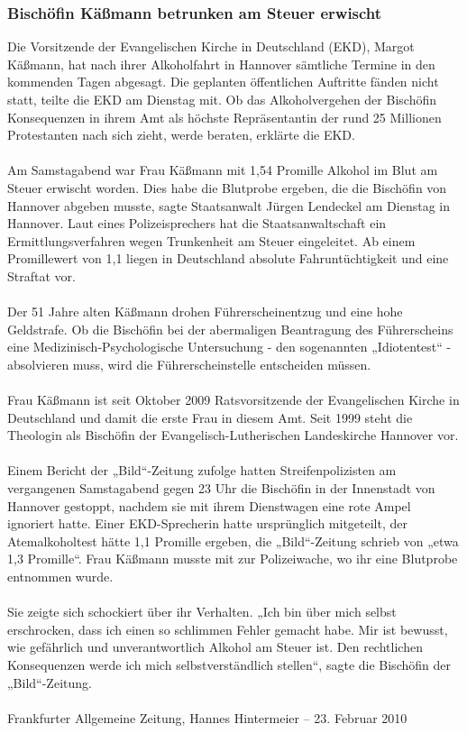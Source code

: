 \documentclass[a4paper,12pt,twoside]{scrbook}
\begin{document}
\subsubsection{Bischöfin Käßmann betrunken am Steuer erwischt}
Die Vorsitzende der Evangelischen Kirche in Deutschland (EKD), Margot Käßmann, hat nach ihrer Alkoholfahrt in Hannover sämtliche Termine in den kommenden Tagen abgesagt. Die geplanten öffentlichen Auftritte fänden nicht statt, teilte die EKD am Dienstag mit. Ob das Alkoholvergehen der Bischöfin Konsequenzen in ihrem Amt als höchste Repräsentantin der rund 25 Millionen Protestanten nach sich zieht, werde beraten, erklärte die EKD.
\\\\
Am Samstagabend war Frau Käßmann mit 1,54 Promille Alkohol im Blut am Steuer erwischt worden. Dies habe die Blutprobe ergeben, die die Bischöfin von Hannover abgeben musste, sagte Staatsanwalt Jürgen Lendeckel am Dienstag in Hannover. Laut eines Polizeisprechers hat die Staatsanwaltschaft ein Ermittlungsverfahren wegen Trunkenheit am Steuer eingeleitet. Ab einem Promillewert von 1,1 liegen in Deutschland absolute Fahruntüchtigkeit und eine Straftat vor.
\\\\
Der 51 Jahre alten Käßmann drohen Führerscheinentzug und eine hohe Geldstrafe. Ob die Bischöfin bei der abermaligen Beantragung des Führerscheins eine Medizinisch-Psychologische Untersuchung - den sogenannten „Idiotentest“ - absolvieren muss, wird die Führerscheinstelle entscheiden müssen.
\\\\
Frau Käßmann ist seit Oktober 2009 Ratsvorsitzende der Evangelischen Kirche in Deutschland und damit die erste Frau in diesem Amt. Seit 1999 steht die Theologin als Bischöfin der Evangelisch-Lutherischen Landeskirche Hannover vor.
\\\\
Einem Bericht der „Bild“-Zeitung zufolge hatten Streifenpolizisten am vergangenen Samstagabend gegen 23 Uhr die Bischöfin in der Innenstadt von Hannover gestoppt, nachdem sie mit ihrem Dienstwagen eine rote Ampel ignoriert hatte. Einer EKD-Sprecherin hatte ursprünglich mitgeteilt, der Atemalkoholtest hätte 1,1 Promille ergeben, die „Bild“-Zeitung schrieb von „etwa 1,3 Promille“. Frau Käßmann musste mit zur Polizeiwache, wo ihr eine Blutprobe entnommen wurde.
\\\\
Sie zeigte sich schockiert über ihr Verhalten. „Ich bin über mich selbst erschrocken, dass ich einen so schlimmen Fehler gemacht habe. Mir ist bewusst, wie gefährlich und unverantwortlich Alkohol am Steuer ist. Den rechtlichen Konsequenzen werde ich mich selbstverständlich stellen“, sagte die Bischöfin der „Bild“-Zeitung.
\\\\
\newpage
Frankfurter Allgemeine Zeitung, Hannes Hintermeier \hfill -- \hfill 23. Februar 2010
\end{document}
